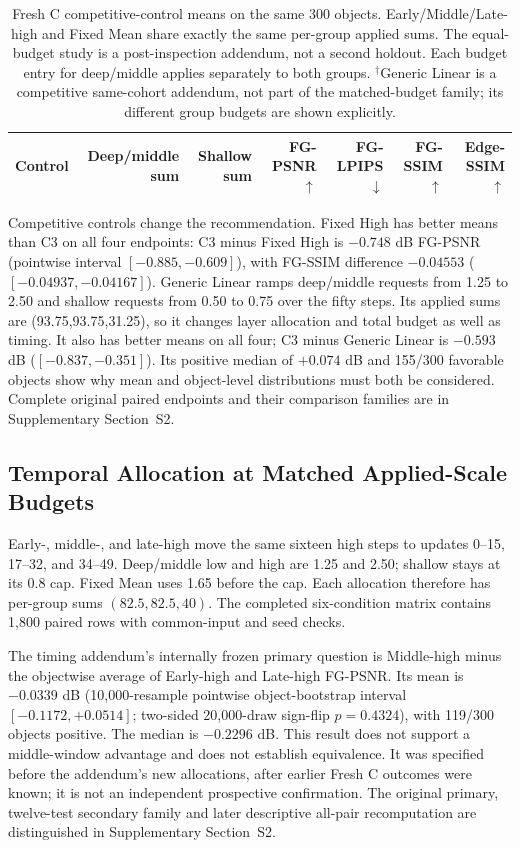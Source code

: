\documentclass[times,twocolumn,final]{elsarticle}
\begin{document}
\begin{table}[t]
\centering\scriptsize\setlength{\tabcolsep}{4pt}
\caption{Fresh C competitive-control means on the same 300 objects. Early/Middle/Late-high and Fixed Mean share exactly the same per-group applied sums. The equal-budget study is a post-inspection addendum, not a second holdout. Each budget entry for deep/middle applies separately to both groups. $^\dagger$Generic Linear is a competitive same-cohort addendum, not part of the matched-budget family; its different group budgets are shown explicitly.}
\label{tab:freshc-absolute}\label{tab:matched-budget300}
\begin{tabular}{lrrrrrr}
\toprule Control & Deep/middle sum & Shallow sum & FG-PSNR$\uparrow$ & FG-LPIPS$\downarrow$ & FG-SSIM$\uparrow$ & Edge-SSIM$\uparrow$ \\
\midrule

\bottomrule
\end{tabular}
\end{table}

Competitive controls change the recommendation. Fixed High has better means than C3 on all four endpoints: C3 minus Fixed High is $-0.748$ dB FG-PSNR (pointwise interval $[-0.885,-0.609]$), with FG-SSIM difference $-0.04553$ ($[-0.04937,-0.04167]$). Generic Linear ramps deep/middle requests from 1.25 to 2.50 and shallow requests from 0.50 to 0.75 over the fifty steps. Its applied sums are (93.75,93.75,31.25), so it changes layer allocation and total budget as well as timing. It also has better means on all four; C3 minus Generic Linear is $-0.593$ dB ($[-0.837,-0.351]$). Its positive median of $+0.074$ dB and 155/300 favorable objects show why mean and object-level distributions must both be considered. Complete original paired endpoints and their comparison families are in Supplementary Section~S2.

\subsection{Temporal Allocation at Matched Applied-Scale Budgets}
\label{subsec:matched-budget300}
Early-, middle-, and late-high move the same sixteen high steps to updates 0--15, 17--32, and 34--49. Deep/middle low and high are 1.25 and 2.50; shallow stays at its 0.8 cap. Fixed Mean uses 1.65 before the cap. Each allocation therefore has per-group sums $(82.5,82.5,40)$. The completed six-condition matrix contains 1,800 paired rows with common-input and seed checks.

The timing addendum's internally frozen primary question is Middle-high minus the objectwise average of Early-high and Late-high FG-PSNR. Its mean is $-0.0339$ dB (10,000-resample pointwise object-bootstrap interval $[-0.1172,+0.0514]$; two-sided 20,000-draw sign-flip $p=0.4324$), with 119/300 objects positive. The median is $-0.2296$ dB. This result does not support a middle-window advantage and does not establish equivalence. It was specified before the addendum's new allocations, after earlier Fresh C outcomes were known; it is not an independent prospective confirmation. The original primary, twelve-test secondary family and later descriptive all-pair recomputation are distinguished in Supplementary Section~S2.
\end{document}
